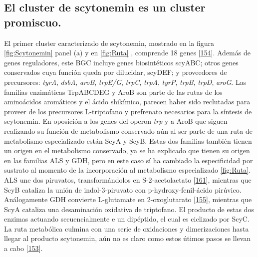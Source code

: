 \documentclass[12pt,twoside]{reedthesis}
\begin{document}
  \subsection{El cluster de scytonemin es un cluster
  promiscuo.}\label{el-cluster-de-scytonemin-es-un-cluster-promiscuo.}
  
  El primer cluster caracterizado de scytonemin, mostrado en la figura
  \autoref{fig:Scytonemin} panel (a) y en \autoref{fig:Ruta} , comprende
  18 genes {[}\protect\hyperlink{ref-soule_comparative_2009}{154}{]}.
  Además de genes reguladores, este BGC incluye genes biosintéticos
  scyABC; otros genes conservados cuya función queda por dilucidar,
  scyDEF; y proveedores de precursores: \emph{tyrA}, \emph{dsbA},
  \emph{aroB}, \emph{trpE/G}, \emph{trpC}, \emph{trpA}, \emph{tyrP},
  \emph{trpB}, \emph{trpD}, \emph{aroG}. Las familias enzimáticas
  TrpABCDEG y AroB son parte de las rutas de los aminoácidos aromáticos y
  el ácido shikímico, parecen haber sido reclutadas para proveer de los
  precursores L-triptofano y prefrenato necesarios para la síntesis de
  scytonemin. En oposición a los genes del operon \emph{trp} y a AroB que
  siguen realizando su función de metabolismo conservado aún al ser parte
  de una ruta de metabolismo especializado están ScyA y ScyB. Estas dos
  familias también tienen un origen en el metabolismo conservado, ya se ha
  explicado que tienen su origen en las familias ALS y GDH, pero en este
  caso sí ha cambiado la especificidad por sustrato al momento de la
  incorporación al metabolismo especializado \autoref{fig:Ruta}. ALS une
  dos piruvatos, transformándolos en S-2-acetolactato
  {[}\protect\hyperlink{ref-liu_acetohydroxyacid_2016}{161}{]}, mientras
  que ScyB cataliza la unión de indol-3-piruvato con p-hydroxy-fenil-ácido
  pirúvico. Análogamente GDH convierte L-glutamate en 2-oxoglutarato
  {[}\protect\hyperlink{ref-engel_glutamate_2014}{155}{]}, mientras que
  ScyA cataliza una desaminación oxidativa de triptofano. El producto de
  estas dos enzimas actuando secuencialmente e un dipéptido, el cual es
  ciclizado por ScyC. La ruta metabólica culmina con una serie de
  oxidaciones y dimerizaciones hasta llegar al producto scytonemin, aún no
  es claro como estos útimos pasos se llevan a cabo
  {[}\protect\hyperlink{ref-balskus_investigating_2008}{153}{]}.
  
\end{document}
